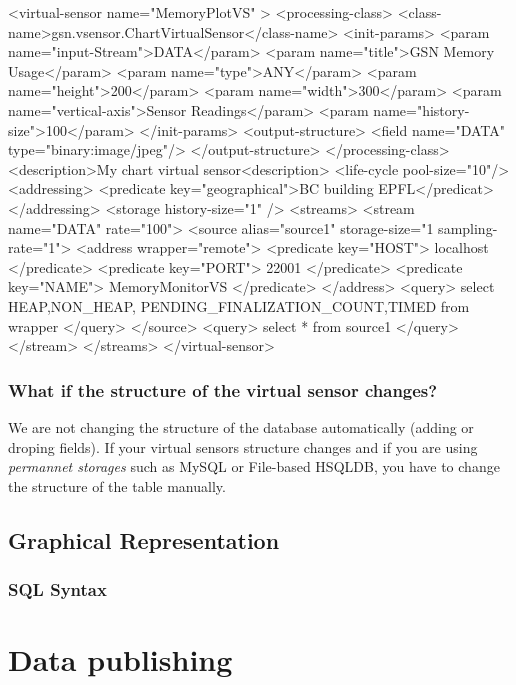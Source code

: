 \begin{xmlcode}[caption={\vsd Example}, label=listing:xml:vsd-example]
<virtual-sensor name="MemoryPlotVS" >
	<processing-class>
	<class-name>gsn.vsensor.ChartVirtualSensor</class-name>
		<init-params>
			<param name="input-Stream">DATA</param>
			<param name="title">GSN Memory Usage</param>
			<param name="type">ANY</param>
			<param name="height">200</param>
			<param name="width">300</param>
			<param name="vertical-axis">Sensor Readings</param>
			<param name="history-size">100</param>
		</init-params>
		<output-structure>
			<field name="DATA" type="binary:image/jpeg"/>
		</output-structure>
	</processing-class>
	<description>My chart virtual sensor<description>
	<life-cycle pool-size="10"/>
	<addressing>
		<predicate key="geographical">BC building EPFL</predicat>
	</addressing>
	<storage history-size="1" />
	<streams>
		<stream name="DATA" rate="100">
			<source alias="source1" storage-size="1 sampling-rate="1">
				<address wrapper="remote">
					<predicate key="HOST"> localhost </predicate>
					<predicate key="PORT"> 22001  </predicate>
					<predicate key="NAME">  MemoryMonitorVS  </predicate>
				</address>
				<query>
					select HEAP,NON_HEAP,
					PENDING_FINALIZATION_COUNT,TIMED
					from wrapper
				</query>
			</source>
			<query>	select * from source1 </query>
		</stream>
	</streams>
</virtual-sensor>
\end{xmlcode}

\subsubsection{What if the structure of the virtual sensor changes?}
We are not changing the structure of the database automatically (adding or droping fields). If your virtual sensors structure
changes and if you are using \emph{permannet storages} such as MySQL or File-based HSQLDB, you have to change the structure of the
table manually.\subsection{Graphical Representation}

\subsubsection{SQL Syntax}

\section{Data publishing}

